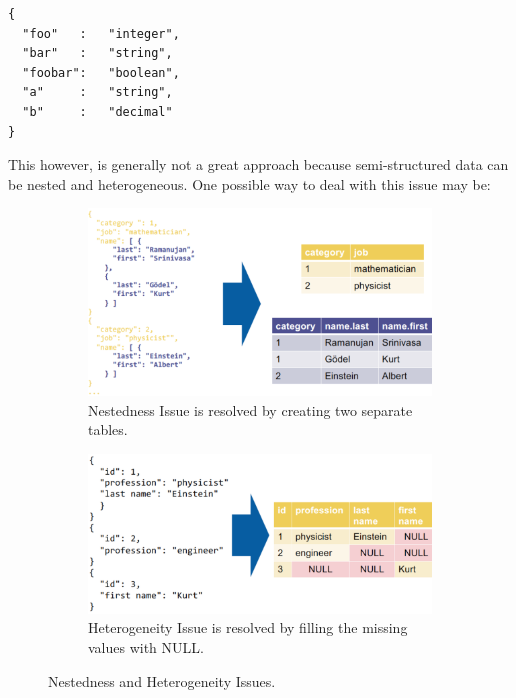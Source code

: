 \begin{lstlisting}[style=json,caption={JSON Schema}]
{
  "foo"   :   "integer",
  "bar"   :   "string",
  "foobar":   "boolean",
  "a"     :   "string",
  "b"     :   "decimal"
}
\end{lstlisting}    

This however, is generally not a great approach because semi-structured data can be nested and heterogeneous. One possible way to deal with this issue may be:

\begin{figure}[h]
    \centering
    \begin{subfigure}{0.49\textwidth}
        \centering
        \includegraphics[width=\textwidth]{Figures/NestednessIssue.png}
        \caption{Nestedness Issue is resolved by creating two separate tables.}
    \end{subfigure}
    \hfill
    \begin{subfigure}{0.49\textwidth}
        \centering
        \includegraphics[width=\textwidth]{Figures/HeterogenetyIssue.png}
        \caption{Heterogeneity Issue is resolved by filling the missing values with NULL.}
    \end{subfigure}
    \caption{Nestedness and Heterogeneity Issues.}
\end{figure}

